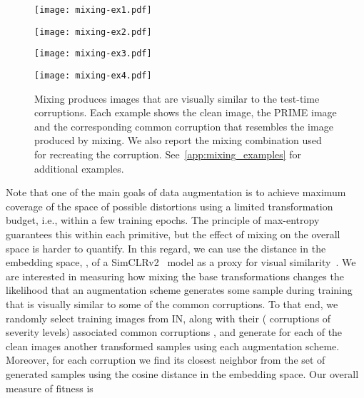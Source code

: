 \documentclass[runningheads]{llncs}
\begin{document}
\begin{figure}[t]
    \centering
    \footnotesize
    \begin{minipage}[c]{0.445\columnwidth}
        \centering
        \texttt{[image: mixing-ex1.pdf]}
\vspace*{-2mm}
\label{fig:mixing-examples:a}
    \end{minipage}
    \begin{minipage}[c]{0.445\columnwidth}
        \centering
        \texttt{[image: mixing-ex2.pdf]}
\vspace*{-2mm}
\label{fig:mixing-examples:b} 
    \end{minipage}
    \begin{minipage}[c]{0.445\columnwidth}
        \centering
        \texttt{[image: mixing-ex3.pdf]}
\vspace*{-4mm}
\label{fig:mixing-examples:d}
    \end{minipage}
    \begin{minipage}[c]{0.445\columnwidth}
        \centering
        \texttt{[image: mixing-ex4.pdf]}
\vspace*{-4mm}
\label{fig:mixing-examples:e}
    \end{minipage}
    \caption{Mixing produces images that are visually similar to the test-time corruptions. Each example shows the clean image, the PRIME image and the corresponding common corruption that resembles the image produced by mixing. We also report the mixing combination used for recreating the corruption. See~\cref{app:mixing_examples} for additional examples.}
    \vspace*{-2mm}
    \label{fig:mixing-examples}
\end{figure}

Note that one of the main goals of data augmentation is to achieve maximum coverage of the space of possible distortions using a limited transformation budget, i.e., within a few training epochs. The principle of max-entropy guarantees this within each primitive, but the effect of mixing on the overall space is harder to quantify. In this regard, we can use the distance in the embedding space, , of a SimCLRv2~\cite{simclr} model as a proxy for visual similarity~\cite{lpips,moayeri_sample_efficient_iccv}. We are interested in measuring how mixing the base transformations changes the likelihood that an augmentation scheme generates some sample during training that is visually similar to some of the common corruptions. To that end, we randomly select  training images  from IN, along with their  ( corruptions of  severity levels) associated common corruptions , and generate for each of the clean images another  transformed samples  using each augmentation scheme. Moreover, for each corruption  we find its closest neighbor  from the set of generated samples using the cosine distance in the embedding space.
Our overall measure of fitness is
\end{document}
